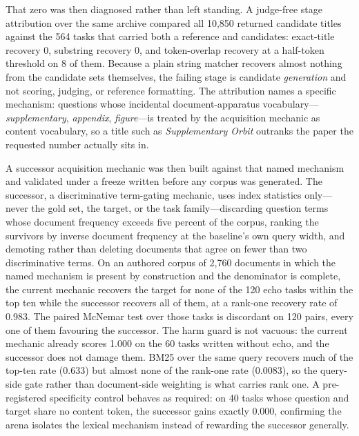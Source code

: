 That zero was then diagnosed rather than left standing.  A judge-free stage
attribution over the same archive compared all 10,850 returned candidate titles
against the 564 tasks that carried both a reference and candidates: exact-title
recovery 0, substring recovery 0, and token-overlap recovery at a half-token
threshold on 8 of them.  Because a plain string matcher
recovers almost nothing from the candidate sets themselves, the failing stage is
candidate \emph{generation} and not scoring, judging, or reference formatting.
The attribution names a specific mechanism: questions whose incidental
document-apparatus vocabulary---\emph{supplementary}, \emph{appendix},
\emph{figure}---is treated by the acquisition mechanic as content vocabulary, so
a title such as \emph{Supplementary Orbit} outranks the paper the requested
number actually sits in.

A successor acquisition mechanic was then built against that named mechanism and
validated under a freeze written before any corpus was generated.  The
successor, a discriminative term-gating mechanic, uses index statistics only---never the
gold set, the target, or the task family---discarding question terms whose
document frequency exceeds five percent of the corpus, ranking the survivors by
inverse document frequency at the baseline's own query width, and demoting rather
than deleting documents that agree on fewer than two discriminative terms.  On an
authored corpus of 2,760 documents in which the named mechanism is present by
construction and the denominator is complete, the current mechanic recovers the
target for none of the 120 echo tasks within the top ten while the successor
recovers all of them, at a rank-one recovery rate of 0.983.  The paired McNemar
test over those tasks is discordant on 120 pairs, every one of them favouring
the successor.  The harm guard is
not vacuous: the current mechanic already scores 1.000 on the 60 tasks written
without echo, and the successor does not damage them.  BM25 over the same query
recovers much of the top-ten rate (0.633) but almost none of the rank-one rate
(0.0083), so the
query-side gate rather than document-side weighting is what carries rank one.  A
pre-registered specificity control behaves as required: on 40 tasks whose
question and target share no content token, the successor gains exactly 0.000,
confirming the arena isolates the lexical mechanism instead of rewarding the
successor generally.

